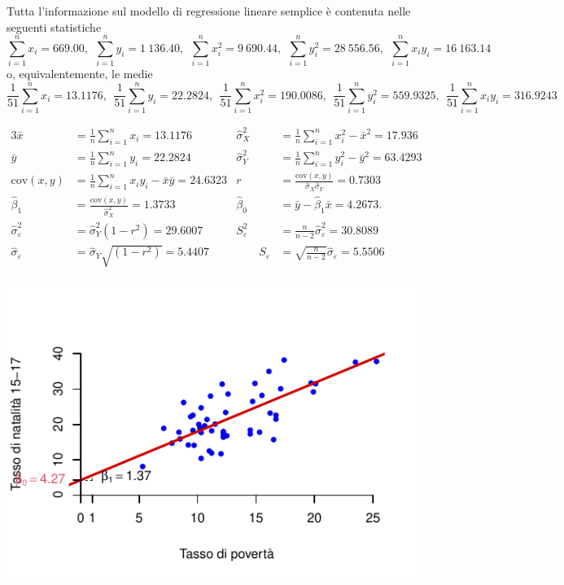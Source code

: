 \documentclass[
  11pt,
]{book}
\theoremstyle{mytheoremstyle}
\theoremstyle{mydefstyle}
\begin{document}
Tutta l'informazione sul modello di regressione lineare semplice è contenuta nelle
seguenti statistiche
\[\sum_{i=1}^n x_i=      669.00,
~~\sum_{i=1}^n y_i=      1~136.40,
~~\sum_{i=1}^n x_i^2=    9~690.44,
~~\sum_{i=1}^ny_i^2=     28~556.56,
~~ \sum_{i=1}^n x_i y_i= 16~163.14\]
o, equivalentemente, le medie
\[\frac{1}{51}\sum_{i=1}^n x_i=      13.1176,
~~\frac{1}{51}\sum_{i=1}^n y_i=      22.2824,
~~\frac{1}{51}\sum_{i=1}^n x_i^2=    190.0086,
~~\frac{1}{51}\sum_{i=1}^ny_i^2=     559.9325,
~~ \frac{1}{51}\sum_{i=1}^n x_i y_i= 316.9243\]

\begin{alignat*}{3}
 \bar x & =  \frac 1 n \sum_{i=1}^n x_i  = 13.1176 &
\hat\sigma_X^2 & =  \frac 1 n \sum_{i=1}^n x_i^2 - \bar x^2  = 17.936 &\\
 \bar y & =  \frac 1 n \sum_{i=1}^n y_i   = 22.2824 &
\hat\sigma_Y^2 & =  \frac 1 n \sum_{i=1}^n y_i^2 - \bar y^2  = 63.4293 &\\
 \text{cov}(x,y) & = \frac 1 n \sum_{i=1}^n x_iy_i -\bar x\bar y  = 24.6323 & 
r & = \frac{\text{cov}(x,y)}{\hat\sigma_X \hat\sigma_Y }  = 0.7303 &\\
\hat\beta_1 & = \frac{\text{cov}(x,y)}{\hat\sigma_X^2} = 1.3733 & 
\hat\beta_0 & = \bar y  - \hat\beta_1\bar x = 4.2673. &\\
\hat\sigma_\varepsilon^2 & = \hat\sigma_Y^2(1-r^2)=29.6007 &
S_\varepsilon^2 & = \frac{n}{n-2}\hat\sigma_\varepsilon^2 = 30.8089\\
\hat\sigma_\varepsilon & = \hat\sigma_Y\sqrt{(1-r^2)}=5.4407 & \qquad
S_\varepsilon & = \sqrt{\frac{n}{n-2}}\hat\sigma_\varepsilon = 5.5506\\
\end{alignat*}

\begin{center}\includegraphics{Esami_passati_con_soluzioni_files/figure-latex/06-regr-46-1} \end{center}
\end{document}
